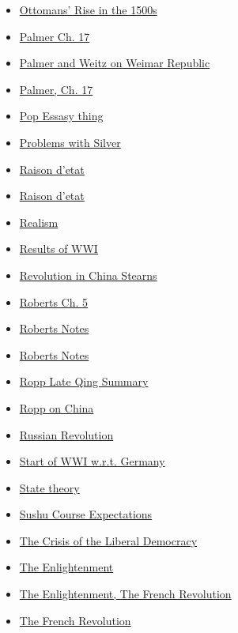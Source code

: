 \documentclass[11pt]{article}
\begin{document}
\begin{itemize}
\begin{itemize}
\item \href{hist201/KBhHIST201OttomansRise.org}{Ottomans' Rise in the 1500s}
\item \href{hist201/KBxPalmerCH17.org}{Palmer Ch. 17}
\item \href{hist201/KBxWeimarRepublic.org}{Palmer and Weitz on Weimar Republic}
\item \href{hist201/KBhHIST201PalmerCh17.org}{Palmer, Ch. 17}
\item \href{hist201/KBxPopExibhit.org}{Pop Essasy thing}
\item \href{hist201/KBhHIST201ProblemsWithSilver.org}{Problems with Silver}
\item \href{hist201/KBhHIST201RaisonDeEtat.org}{Raison d'etat}
\item \href{hist201/KBrefRaisondetat.org}{Raison d'etat}
\item \href{hist201/KBhHIST201Realism.org}{Realism}
\item \href{hist201/KBhHIST201WWIResults.org}{Results of WWI}
\item \href{hist201/KBe21hist201floRevolutionInChina.org}{Revolution in China Stearns}
\item \href{hist201/KBhHIST201RobertsCh5.org}{Roberts Ch. 5}
\item \href{hist201/KBRobertsNotes.org}{Roberts Notes}
\item \href{hist201/KBOnRoberts.org}{Roberts Notes}
\item \href{hist201/KBe20hist201retRoppLateQingSummary.org}{Ropp Late Qing Summary}
\item \href{hist201/KBxRoppChina.org}{Ropp on China}
\item \href{hist201/KBhHIST201RussianRevolution.org}{Russian Revolution}
\item \href{hist201/KBhHIST201WWIStartWRTGermany.org}{Start of WWI w.r.t. Germany}
\item \href{hist201/KB20200827104601.org}{State theory}
\item \href{hist201/KBhHIST201SushuCourseExpectation.org}{Sushu Course Expectations}
\item \href{hist201/KBhHIST201CrisisOfLibDemo.org}{The Crisis of the Liberal Democracy}
\item \href{hist201/KBhHIST201TheEnlightenment.org}{The Enlightenment}
\item \href{hist201/KBhHIST201EnlightenmentFrenchRev.org}{The Enlightenment, The French Revolution}
\item \href{hist201/KBhHIST201FrenchRevolution.org}{The French Revolution}

\end{itemize}
\end{itemize}
\end{document}
